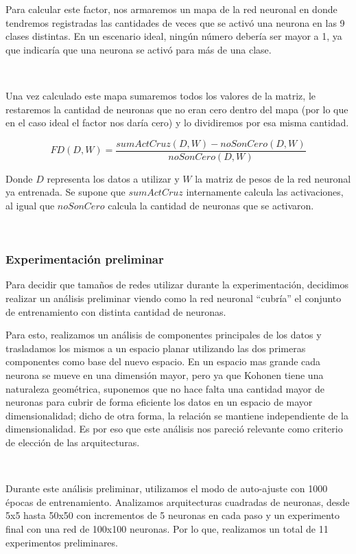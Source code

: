 \documentclass[informe.tex]{subfiles}
\begin{document}
      Para calcular este factor, nos armaremos un mapa de la red neuronal en donde tendremos registradas las cantidades de veces que se activó una neurona en las 9 clases distintas. En un escenario ideal, ningún número debería ser mayor a 1, ya que indicaría que una neurona se activó para más de una clase.
      
      ~
      
      Una vez calculado este mapa sumaremos todos los valores de la matriz, le restaremos la cantidad de neuronas que no eran cero dentro del mapa (por lo que en el caso ideal el factor nos daría cero) y lo dividiremos por esa misma cantidad.
      
      $$FD(D, W) = \frac{sumActCruz(D, W) - noSonCero(D, W)}{noSonCero(D, W)}$$
      
      Donde $D$ representa los datos a utilizar y $W$ la matriz de pesos de la red neuronal ya entrenada. Se supone que $sumActCruz$ internamente calcula las activaciones, al igual que $noSonCero$ calcula la cantidad de neuronas que se activaron.
      
      ~

      \subsubsection{Experimentaci\'on preliminar}
      Para decidir que tama\~nos de redes utilizar durante la experimentaci\'on, decidimos realizar un an\'alisis preliminar viendo como la red neuronal ``cubr\'ia'' el conjunto de entrenamiento con distinta cantidad de neuronas.
      ~
      
      Para esto, realizamos un an\'alisis de componentes principales de los datos y trasladamos los mismos a un espacio planar utilizando las dos primeras componentes como base del nuevo espacio. En un espacio mas grande cada neurona se mueve en una dimensi\'on mayor, pero ya que Kohonen tiene una naturaleza geom\'etrica, suponemos que no hace falta una cantidad mayor de neuronas para cubrir de forma eficiente los datos en un espacio de mayor dimensionalidad; dicho de otra forma, la relaci\'on se mantiene independiente de la dimensionalidad. Es por eso que este an\'alisis nos pareci\'o relevante como criterio de elecci\'on de las arquitecturas.
      
      ~
      
      Durante este an\'alisis preliminar, utilizamos el modo de auto-ajuste con 1000 \'epocas de entrenamiento. Analizamos arquitecturas cuadradas de neuronas, desde 5x5 hasta 50x50 con incrementos de 5 neuronas en cada paso y un experimento final con una red de 100x100 neuronas. Por lo que, realizamos un total de 11 experimentos preliminares.
      
\end{document}
